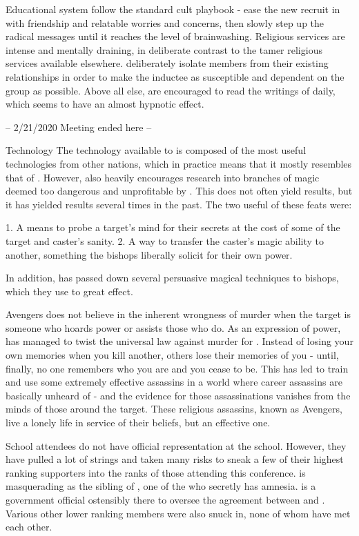 \documentclass[blue]{GL2020}
\begin{document}
Educational system
\pCult follow the standard cult playbook - ease the new recruit in with friendship and relatable worries and concerns, then slowly step up the radical messages until it reaches the level of brainwashing. Religious services are intense and mentally draining, in deliberate contrast to the tamer religious services available elsewhere. \pCult deliberately isolate members from their existing relationships in order to make the inductee as susceptible and dependent on the group as possible. Above all else, \pCult are encouraged to read the writings of \cCultLeader daily, which seems to have an almost hypnotic effect.


 -- 2/21/2020 Meeting ended here --


Technology
The technology available to \pCult is composed of the most useful technologies from other nations, which in practice means that it mostly resembles that of \pTech. However, \pCult also heavily encourages research into branches of magic deemed too dangerous and unprofitable by \pTech. This does not often yield results, but it has yielded results several times in the past. The two useful of these feats were: 

1. A means to probe a target's mind for their secrets at the cost of some of the target and caster's sanity. 
2. A way to transfer the caster's magic ability to another, something the bishops liberally solicit for their own power.

In addition, \cCultLeader has passed down several persuasive magical techniques to bishops, which they use to great effect.

Avengers
\pCult does not believe in the inherent wrongness of murder when the target is someone who hoards power or assists those who do. As an expression of power, \cCultGod has managed to twist the universal law against murder for \pCult. Instead of losing your own memories when you kill another, others lose their memories of you - until, finally, no one remembers who you are and you cease to be. This has led \pCult to train and use some extremely effective assassins in a world where career assassins are basically unheard of - and the evidence for those assassinations vanishes from the minds of those around the target. These religious assassins, known as Avengers, live a lonely life in service of their beliefs, but an effective one.

School attendees
\pCult do not have official representation at the school. However, they have pulled a lot of strings and taken many risks to sneak a few of their highest ranking supporters into the ranks of those attending this conference. \cCultLeader is masquerading as the sibling of \cAmnesiac, one of the \pViking who secretly has amnesia. \cTechBishop is a government official ostensibly there to oversee the agreement between \pTech and \pFarm. Various other lower ranking members were also snuck in, none of whom have met each other.
\end{document}
